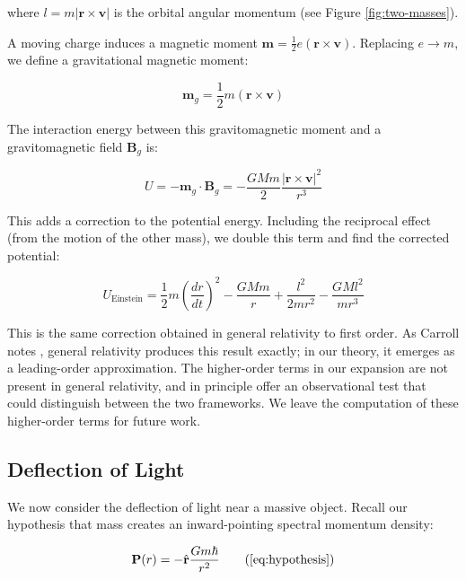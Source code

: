 \documentclass {article}
\renewcommand\vec{\mathbf}
\let\OldHat\hat
\renewcommand{\hat}[1]{\OldHat{\mathbf{#1}}}
\begin{document}
where \( l = m |\vec{r} \times \vec{v}| \) is the orbital angular momentum (see Figure \ref{fig:two-masses}).


A moving charge induces a magnetic moment \( \vec{m} = \frac{1}{2} e (\vec{r} \times \vec{v}) \). Replacing \( e \rightarrow m \), we define a gravitational magnetic moment:

\begin{equation}
\vec{m}_g = \frac{1}{2} m (\vec{r} \times \vec{v})
\end{equation}

The interaction energy between this gravitomagnetic moment and a gravitomagnetic field $\vec{B}_g$ is:

\begin{equation}
U = -\vec{m}_g \cdot \vec{B}_g = -\frac{GM m}{2} \frac {|\vec{r} \times \vec{v}|^2} { r^3}
\end{equation}

This adds a correction to the potential energy. Including the reciprocal effect (from the motion of the other mass), we double this term and find the corrected potential:

\begin{equation}
U_{\text{Einstein}} = \frac{1}{2} m \left( \frac{dr}{dt} \right)^2 - \frac{GMm}{r}
+ \frac{l^2}{2 m r^2} - \frac{GM l^2}{m r^3}
\end{equation}


This is the same correction obtained in general relativity to first order. As Carroll\cite{carroll} notes , general relativity produces this result exactly; in our theory, it emerges as a leading-order approximation. The higher-order terms in our expansion are not present in general relativity, and in principle offer an observational test that could distinguish between the two frameworks. We leave the computation of these higher-order terms for future work.



\subsection{Deflection of Light}

We now consider the deflection of light near a massive object. Recall our hypothesis that mass creates an inward-pointing spectral momentum density:

\begin{equation}
\vec{P}(r) = - \hat{r} \frac{G m \hbar}{r^2}
\tag{\ref{eq:hypothesis}}
\end{equation}
\end{document}
